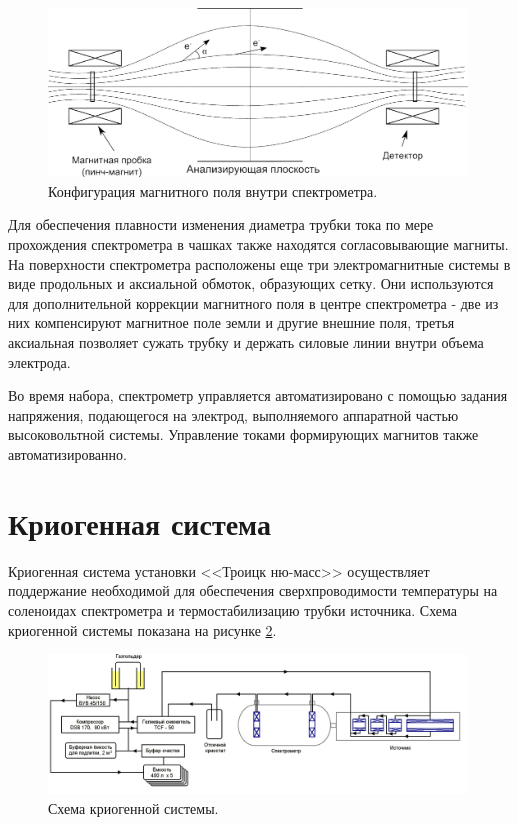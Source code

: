 \documentclass[a4paper,14pt]{extreport}
\begin{document}
\begin{figure}
  \centering
  \includegraphics[width = 0.99\textwidth]{img/nu_mass_setup/spectrometer-fields.png}
    \caption{Конфигурация магнитного поля внутри спектрометра.}
    \label{fig:numass-spectrometer-fields}
\end{figure}

Для обеспечения плавности изменения диаметра трубки тока по мере прохождения спектрометра в чашках также находятся согласовывающие магниты. На поверхности спектрометра расположены еще три электромагнитные системы в виде продольных и аксиальной обмоток, образующих сетку. Они используются для дополнительной коррекции магнитного поля в центре спектрометра - две из них компенсируют магнитное поле земли и другие внешние поля,  третья аксиальная позволяет сужать трубку и держать силовые линии внутри объема электрода. 

Во время набора, спектрометр управляется автоматизировано с помощью задания напряжения, подающегося на электрод, выполняемого аппаратной частью высоковольтной системы. Управление токами формирующих магнитов также автоматизированно.

\section{Криогенная система}

Криогенная система установки <<Троицк ню-масс>> осуществляет поддержание необходимой для обеспечения сверхпроводимости температуры на соленоидах спектрометра и термостабилизацию трубки источника. Схема криогенной системы показана на рисунке \ref{fig:numass-cryogenic}.

\begin{figure}
  \centering
  \includegraphics[width = 0.99\textwidth]{img/nu_mass_setup/cryogenic.png}
    \caption{Схема криогенной системы.}
    \label{fig:numass-cryogenic}
\end{figure}
\end{document}
